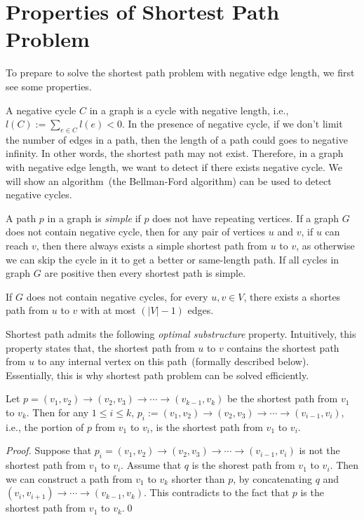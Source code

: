 \section*{Properties of Shortest Path Problem}

To prepare to solve the shortest path problem with negative edge length, we first see some properties.

A negative cycle $C$ in a graph is a cycle with negative length, i.e., $l(C) := \sum_{e\in C} l(e) < 0$.
In the presence of negative cycle, if we don't limit the number of edges
in a path, then the length of a path could goes to negative infinity.
In other words, the shortest path may not exist.
Therefore, in a graph with negative edge length, we want to
detect if there exists negative cycle.
We will show an algorithm~(the Bellman-Ford algorithm) can be used to detect negative cycles.

A path $p$ in a graph is \emph{simple} if $p$ does not have repeating vertices.
If a graph $G$ does not contain negative cycle, then 
for any pair of vertices $u$ and $v$, if $u$ can reach $v$,
then there always exists a {simple} shortest path from $u$ to $v$,
as otherwise we can skip the cycle in it to get a better or same-length path.
If all cycles in graph $G$ are positive then every shortest path is simple.

\begin{property}
If $G$ does not contain negative cycles, for every $u,v\in V$, there exists a shortes path
from $u$ to $v$ with at most $(|V| - 1)$ edges.
\end{property}

Shortest path admits the following \emph{optimal substructure} property.
Intuitively, this property states that, the shortest path from $u$ to $v$
contains the shortest path from $u$ to any internal vertex on this path~(formally described below).
Essentially, this is why shortest path problem can be solved efficiently.

\begin{property}
Let $p = (v_1, v_2) \to (v_2, v_3) \to \cdots \to (v_{k-1}, v_k)$
be the shortest path from $v_1$ to $v_k$.
Then for any $1\le i \le k$,
$p_i := (v_1, v_2) \to (v_2, v_3) \to \cdots \to (v_{i-1}, v_i)$, i.e., the portion of $p$ from $v_1$ to $v_i$,
is the shortest path from $v_1$ to $v_i$.
\end{property}

\emph{Proof.} Suppose that 
$p_i = (v_1, v_2) \to (v_2, v_3) \to \cdots \to (v_{i-1}, v_i)$
is not the shortest path from $v_1$ to $v_i$. Assume that
$q$ is the shorest path from $v_1$ to $v_i$.
Then we can construct a path from $v_1$ to $v_k$ shorter than $p$,
by concatenating $q$ and $(v_i, v_{i+1}) \to \cdots \to (v_{k-1}, v_k)$.
This contradicts to the fact that $p$ is the shortest path from $v_1$ to $v_k$.\qed

